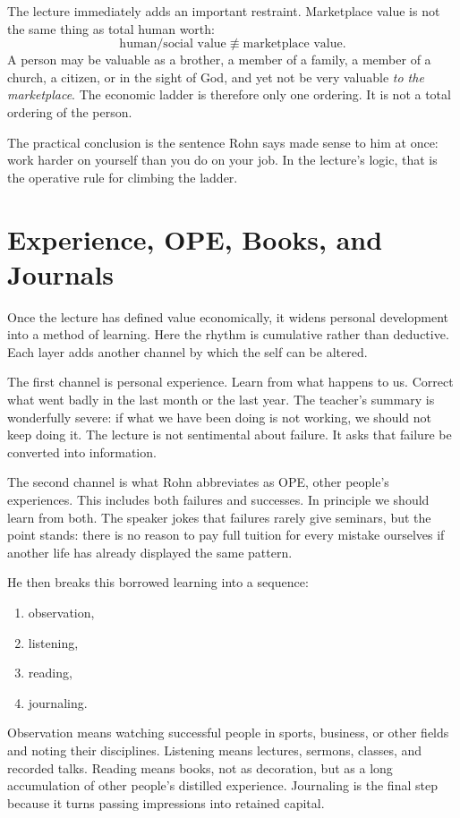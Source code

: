 The lecture immediately adds an important restraint. Marketplace value is not the same thing as total human worth:
\begin{equation}
\text{human/social value} \not\equiv \text{marketplace value}.
\end{equation}
A person may be valuable as a brother, a member of a family, a member of a church, a citizen, or in the sight of God, and yet not be very valuable \emph{to the marketplace}. The economic ladder is therefore only one ordering. It is not a total ordering of the person.

The practical conclusion is the sentence Rohn says made sense to him at once: work harder on yourself than you do on your job. In the lecture's logic, that is the operative rule for climbing the ladder.

\section{Experience, OPE, Books, and Journals}

Once the lecture has defined value economically, it widens personal development into a method of learning. Here the rhythm is cumulative rather than deductive. Each layer adds another channel by which the self can be altered.

The first channel is personal experience. Learn from what happens to us. Correct what went badly in the last month or the last year. The teacher's summary is wonderfully severe: if what we have been doing is not working, we should not keep doing it. The lecture is not sentimental about failure. It asks that failure be converted into information.

The second channel is what Rohn abbreviates as OPE, other people's experiences. This includes both failures and successes. In principle we should learn from both. The speaker jokes that failures rarely give seminars, but the point stands: there is no reason to pay full tuition for every mistake ourselves if another life has already displayed the same pattern.

He then breaks this borrowed learning into a sequence:
\begin{enumerate}
\item observation,
\item listening,
\item reading,
\item journaling.
\end{enumerate}
Observation means watching successful people in sports, business, or other fields and noting their disciplines. Listening means lectures, sermons, classes, and recorded talks. Reading means books, not as decoration, but as a long accumulation of other people's distilled experience. Journaling is the final step because it turns passing impressions into retained capital.

